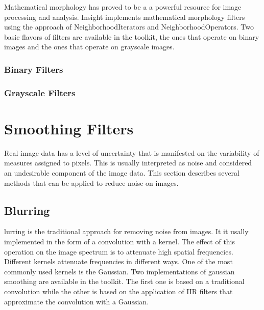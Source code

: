 Mathematical morphology has proved to be a a powerful resource for image
processing and analysis. Insight implements mathematical morphology filters
using the approach of NeighborhoodIterators and NeighborhoodOperators. Two
basic flavors of filters are available in the toolkit, the ones that operate on
binary images and the ones that operate on grayscale images. 

\subsubsection{Binary Filters}
\label{sec:MathematicalMorphologyBinaryFilters}

%


\subsubsection{Grayscale Filters}
\label{sec:MathematicalMorphologyGrayscaleFilters}

%




\section{Smoothing Filters}
\label{sec:SmoothingFilters}

Real image data has a level of uncertainty that is manifested on the
variability of measures assigned to pixels. This is usually interpreted as
noise and considered an undesirable component of the image data. This section
describes several methods that can be applied to reduce noise on images.

\subsection{Blurring}
\label{sec:BlurringFilters}

lurring is the traditional approach for removing noise from images. It it
usally implemented in the form of a convolution with a kernel. The effect of
this operation on the image spectrum is to attenuate high spatial frequencies.
Different kernels attenuate frequencies in different ways. One of the most
commonly used kernels is the Gaussian. Two implementations of gaussian
smoothing are available in the toolkit. The first one is based on a traditional
convolution while the other is based on the application of IIR filters that
approximate the convolution with a Gaussian. 

